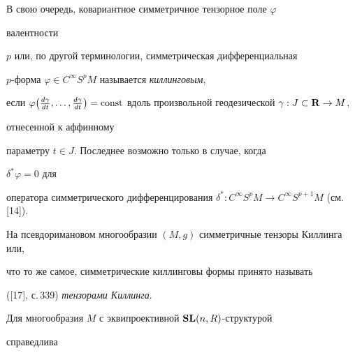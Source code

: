  


 


В свою очередь, ковариантное симметричное тензорное поле $\varphi$ 


валентности 


$p$ или, по другой терминологии, симметрическая дифференциальная 


$p$-форма $\varphi\in C^\infty S^p M$ называется {\it киллинговым}, 


если $\varphi\big(\frac{d\gamma}{dt},\dotsc, \frac{d\gamma}{dt}\big)= 


\const$ вдоль произвольной геодезической $\gamma:J\subset\bold R\to M$, 


отнесенной к аффинному 


параметру $t\in J$. Последнее возможно только в случае, когда 


$\delta^*\varphi=0$ для 


оператора симметрического дифференцирования $\delta^*:C^\infty S^p M\to 


C^\infty S^{p+1}M$ (см. [14]). 


 


На псевдоримановом многообразии $(M,g)$ симметричные тензоры Киллинга или, 


что то же самое, симметрические киллинговы формы принято называть 


([17], с.\,339) {\it тензорами Киллинга}. 


 


Для многообразия $M$ с эквипроективной $\bold {SL}(n,R)$-структурой 


справедлива 


 


 


